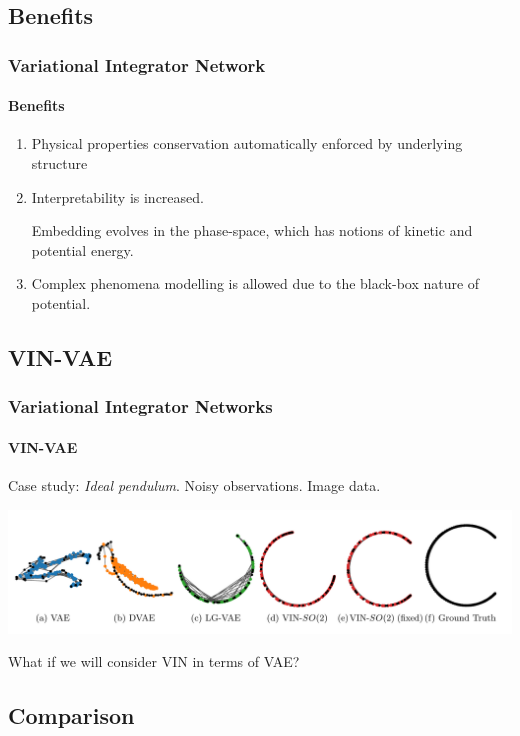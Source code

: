 \documentclass[
    11pt, %
    aspectratio=169, ]{beamer}%
\begin{document}
\subsection{Benefits}

\begin{frame}
    \frametitle{Variational Integrator Network}
    \framesubtitle{Benefits}

    \begin{enumerate}
        \item Physical properties conservation automatically enforced by underlying structure

              \item{Interpretability
                          is increased.

                          Embedding evolves in the phase-space, which has notions of kinetic and
                          potential energy. }
        \item Complex phenomena modelling is allowed due to the black-box nature of
              potential.
    \end{enumerate}

\end{frame}

\subsection{VIN-VAE}

\begin{frame}
    \frametitle{Variational Integrator Networks}
    \framesubtitle{VIN-VAE}
    Case study: \textit{Ideal pendulum}. Noisy observations. Image data.

    \includegraphics[width=15cm]{assets/vin-vae.png}

    What if we will consider VIN in terms of VAE\@?

\end{frame}

\subsection{Comparison}
\end{document}
